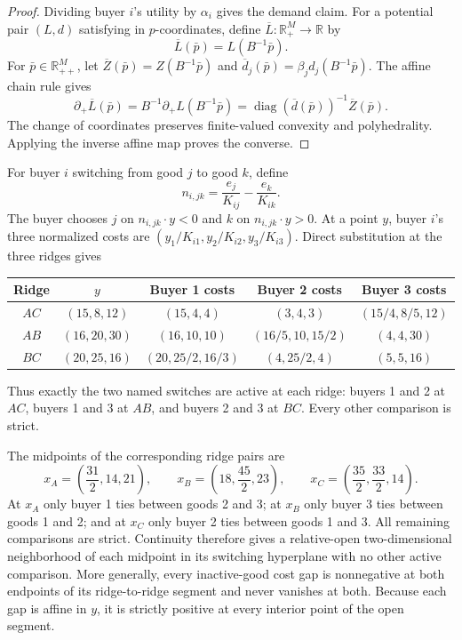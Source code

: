 \documentclass[11pt,a4paper,fleqn]{article}
\theoremstyle{plain}
\theoremstyle{definition}
\newcommand{\R}{\mathbb{R}}
\newcommand{\diag}{\operatorname{diag}}
\begin{document}
\begin{proof}
Dividing buyer $i$'s utility by $\alpha_i$ gives the demand claim. For a potential pair $(L,d)$ satisfying  in $p$-coordinates, define $\overline L:\R_+^M\to\R$ by
\[
\overline L(\bar p)=L(B^{-1}\bar p).
\]
For $\bar p\in\R_{++}^M$, let $\overline Z(\bar p)=Z(B^{-1}\bar p)$ and $\overline d_j(\bar p)=\beta_jd_j(B^{-1}\bar p)$. The affine chain rule gives
\[
\partial_+\overline L(\bar p)
=B^{-1}\partial_+ L(B^{-1}\bar p)
=\diag(\overline d(\bar p))^{-1}\overline Z(\bar p).
\]
The change of coordinates preserves finite-valued convexity and polyhedrality. Applying the inverse affine map proves the converse.
\end{proof}

For buyer $i$ switching from good $j$ to good $k$, define
\begin{equation}\label{eq:facet-normal-general}
n_{i,jk}=\frac{e_j}{K_{ij}}-\frac{e_k}{K_{ik}}.
\end{equation}
The buyer chooses $j$ on $n_{i,jk}\cdot y<0$ and $k$ on $n_{i,jk}\cdot y>0$. At a point $y$, buyer $i$'s three normalized costs are $(y_1/K_{i1},y_2/K_{i2},y_3/K_{i3})$. Direct substitution at the three ridges gives
\begin{center}
\scriptsize
\begin{tabular}{@{}ccccc@{}}
\toprule
Ridge & $y$ & Buyer 1 costs & Buyer 2 costs & Buyer 3 costs\\
\midrule
$AC$ & $(15,8,12)$ & $(15,4,4)$ & $(3,4,3)$ & $(15/4,8/5,12)$\\
$AB$ & $(16,20,30)$ & $(16,10,10)$ & $(16/5,10,15/2)$ & $(4,4,30)$\\
$BC$ & $(20,25,16)$ & $(20,25/2,16/3)$ & $(4,25/2,4)$ & $(5,5,16)$\\
\bottomrule
\end{tabular}
\end{center}
Thus exactly the two named switches are active at each ridge: buyers 1 and 2 at $AC$, buyers 1 and 3 at $AB$, and buyers 2 and 3 at $BC$. Every other comparison is strict.

The midpoints of the corresponding ridge pairs are
\[
x_A=\left(\frac{31}{2},14,21\right),\qquad
x_B=\left(18,\frac{45}{2},23\right),\qquad
x_C=\left(\frac{35}{2},\frac{33}{2},14\right).
\]
At $x_A$ only buyer 1 ties between goods 2 and 3; at $x_B$ only buyer 3 ties between goods 1 and 2; and at $x_C$ only buyer 2 ties between goods 1 and 3. All remaining comparisons are strict. Continuity therefore gives a relative-open two-dimensional neighborhood of each midpoint in its switching hyperplane with no other active comparison. More generally, every inactive-good cost gap is nonnegative at both endpoints of its ridge-to-ridge segment and never vanishes at both. Because each gap is affine in $y$, it is strictly positive at every interior point of the open segment.
\end{document}
